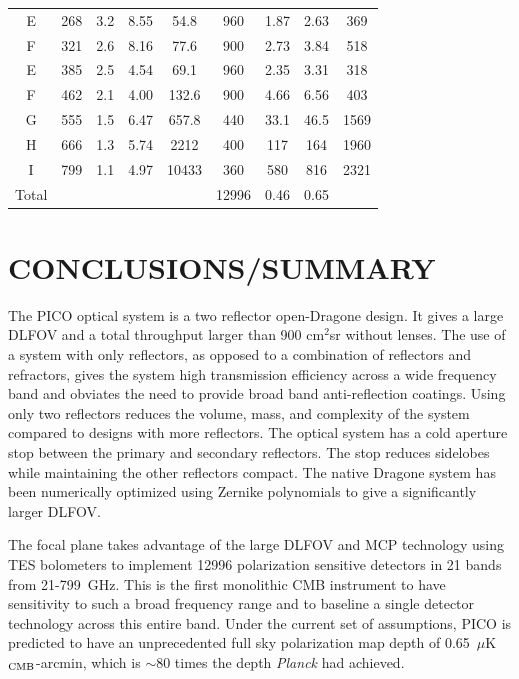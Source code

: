 \documentclass[]{spie}  %
\begin{document}
\begin{table}[ht]
\begin{tabular}{|c|c|c|c|c|c|c|cc|}
E        & 268 & 3.2  & 8.55   & 54.8    & 960   & 1.87   & 2.63 & 369    \\
F        & 321 & 2.6  & 8.16   & 77.6    & 900   & 2.73   & 3.84 & 518    \\
E        & 385 & 2.5  & 4.54   & 69.1    & 960   & 2.35   & 3.31 & 318    \\
F        & 462 & 2.1  & 4.00    & 132.6   & 900   & 4.66   & 6.56 & 403    \\
G        & 555 & 1.5  & 6.47   & 657.8   & 440    & 33.1   & 46.5 & 1569  \\
H        & 666 & 1.3  & 5.74   & 2212    & 400     & 117    & 164  & 1960 \\
I          & 799 & 1.1  & 4.97   & 10433   & 360   & 580    & 816  & 2321 \\ 
\hline
Total   &     &      &       &         & 12996 & 0.46   & 0.65 &   \\
\hline
\end{tabular}
\end{table}

\section{CONCLUSIONS/SUMMARY}

The PICO optical system is a two reflector open-Dragone design. It gives a large DLFOV and a total 
throughput larger than 900 cm$^{2}$sr without lenses. The use of a system 
with only reflectors, as opposed to a combination of reflectors and refractors, gives the system high transmission efficiency 
across a wide frequency band and obviates the need to provide broad band anti-reflection coatings. 
Using only two reflectors reduces the volume, mass, and complexity of the system compared to designs with more 
reflectors. The optical system has a cold aperture stop between the primary and secondary reflectors. The stop 
reduces sidelobes while maintaining the other reflectors compact. The native Dragone system has been 
numerically optimized using Zernike polynomials to give a significantly larger DLFOV. 

The focal plane takes advantage of the large DLFOV and MCP 
technology using TES bolometers to implement 12996 polarization sensitive detectors in 21 bands from 21-799~GHz. 
This is the first monolithic CMB instrument to have sensitivity to such a broad frequency range and to baseline a single detector technology 
across this entire band. Under the current set of assumptions, PICO is predicted to have an unprecedented full sky polarization 
map depth of 0.65~$\mu$K$_{\rm CMB}$-arcmin, which is $\sim$80 times the depth {\it Planck} had achieved. 
\end{document}
